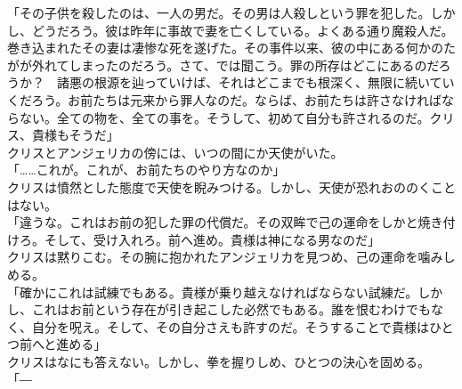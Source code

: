 \documentclass[b5j,10pt,openany]{jsbook}
\begin{document}
「その子供を殺したのは、一人の男だ。その男は人殺しという罪を犯した。しかし、どうだろう。彼は昨年に事故で妻を亡くしている。よくある通り魔殺人だ。巻き込まれたその妻は凄惨な死を遂げた。その事件以来、彼の中にある何かのたがが外れてしまったのだろう。さて、では聞こう。罪の所存はどこにあるのだろうか？　諸悪の根源を辿っていけば、それはどこまでも根深く、無限に続いていくだろう。お前たちは元来から罪人なのだ。ならば、お前たちは許さなければならない。全ての物を、全ての事を。そうして、初めて自分も許されるのだ。クリス、貴様もそうだ」\\クリスとアンジェリカの傍には、いつの間にか天使がいた。\\「\ldots{}\ldots{}これが。これが、お前たちのやり方なのか」\\クリスは憤然とした態度で天使を睨みつける。しかし、天使が恐れおののくことはない。\\「違うな。これはお前の犯した罪の代償だ。その双眸で己の運命をしかと焼き付けろ。そして、受け入れろ。前へ進め。貴様は神になる男なのだ」\\クリスは黙りこむ。その腕に抱かれたアンジェリカを見つめ、己の運命を噛みしめる。\\「確かにこれは試練でもある。貴様が乗り越えなければならない試練だ。しかし、これはお前という存在が引き起こした必然でもある。誰を恨むわけでもなく、自分を呪え。そして、その自分さえも許すのだ。そうすることで貴様はひとつ前へと進める」\\クリスはなにも答えない。しかし、拳を握りしめ、ひとつの決心を固める。\\「―
\end{document}
